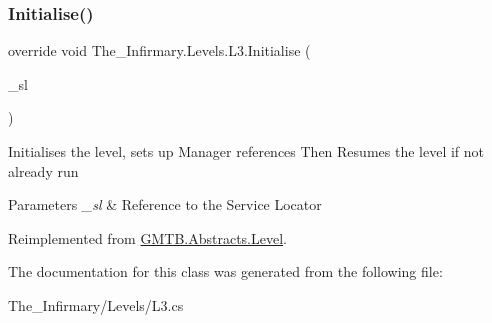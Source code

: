 \subsubsection{\texorpdfstring{Initialise()}{Initialise()}}
{\footnotesize\ttfamily override void The\+\_\+\+Infirmary.\+Levels.\+L3.\+Initialise (\begin{DoxyParamCaption}\item[{\mbox{\hyperlink{interface_g_m_t_b_1_1_interfaces_1_1_i_service_locator}{I\+Service\+Locator}}}]{\+\_\+sl }\end{DoxyParamCaption})\hspace{0.3cm}{\ttfamily [virtual]}}



Initialises the level, sets up Manager references Then Resumes the level if not already run 


\begin{DoxyParams}{Parameters}
{\em \+\_\+sl} & Reference to the Service Locator \\
\hline
\end{DoxyParams}


Reimplemented from \mbox{\hyperlink{class_g_m_t_b_1_1_abstracts_1_1_level_a0048401bb0fb66b0fb0c19b3b25e4265}{G\+M\+T\+B.\+Abstracts.\+Level}}.



The documentation for this class was generated from the following file\+:\begin{DoxyCompactItemize}
\item 
The\+\_\+\+Infirmary/\+Levels/L3.\+cs\end{DoxyCompactItemize}
